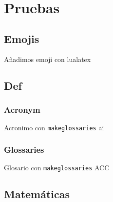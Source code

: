 \chapter*{Pruebas}

\section*{Emojis}

Añadimos emoji con lualatex {}

\section*{Def}

\subsection*{Acronym}

Acronimo con \texttt{makeglossaries} \acrshort{ai}

\subsection*{Glossaries}

Glosario con \texttt{makeglossaries} \gls{ACC}

\section*{Matemáticas}

% 